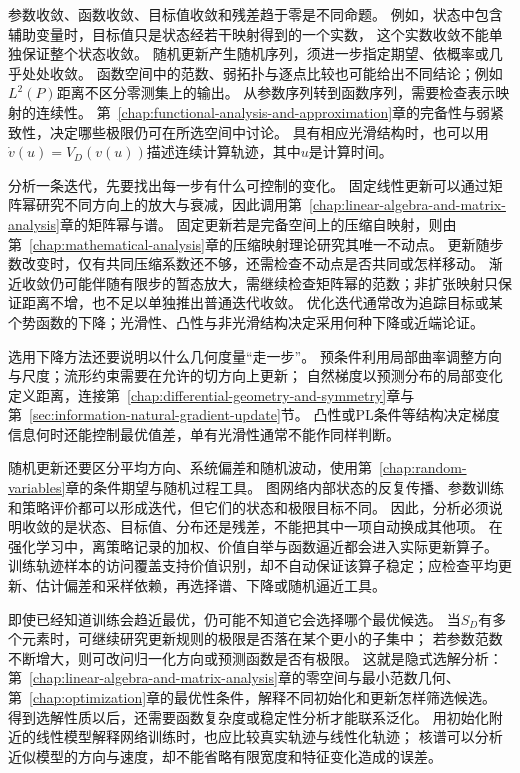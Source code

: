 参数收敛、函数收敛、目标值收敛和残差趋于零是不同命题。
例如，状态中包含辅助变量时，目标值只是状态经若干映射得到的一个实数，
这个实数收敛不能单独保证整个状态收敛。
随机更新产生随机序列，须进一步指定期望、依概率或几乎处处收敛。
函数空间中的范数、弱拓扑与逐点比较也可能给出不同结论；例如$L^2(P)$距离不区分零测集上的输出。
从参数序列转到函数序列，需要检查表示映射的连续性。
第~\ref{chap:functional-analysis-and-approximation}章的完备性与弱紧致性，决定哪些极限仍可在所选空间中讨论。
具有相应光滑结构时，也可以用$\dot v(u)=V_D(v(u))$描述连续计算轨迹，其中$u$是计算时间。

分析一条迭代，先要找出每一步有什么可控制的变化。
固定线性更新可以通过矩阵幂研究不同方向上的放大与衰减，因此调用第~\ref{chap:linear-algebra-and-matrix-analysis}章的矩阵幂与谱。
固定更新若是完备空间上的压缩自映射，则由第~\ref{chap:mathematical-analysis}章的压缩映射理论研究其唯一不动点。
更新随步数改变时，仅有共同压缩系数还不够，还需检查不动点是否共同或怎样移动。
渐近收敛仍可能伴随有限步的暂态放大，需继续检查矩阵幂的范数；非扩张映射只保证距离不增，也不足以单独推出普通迭代收敛。
优化迭代通常改为追踪目标或某个势函数的下降；光滑性、凸性与非光滑结构决定采用何种下降或近端论证。

选用下降方法还要说明以什么几何度量“走一步”。
预条件利用局部曲率调整方向与尺度；流形约束需要在允许的切方向上更新；
自然梯度以预测分布的局部变化定义距离，连接第~\ref{chap:differential-geometry-and-symmetry}章与第~\ref{sec:information-natural-gradient-update}节。
凸性或PL条件等结构决定梯度信息何时还能控制最优值差，单有光滑性通常不能作同样判断。

随机更新还要区分平均方向、系统偏差和随机波动，使用第~\ref{chap:random-variables}章的条件期望与随机过程工具。
图网络内部状态的反复传播、参数训练和策略评价都可以形成迭代，但它们的状态和极限目标不同。
因此，分析必须说明收敛的是状态、目标值、分布还是残差，不能把其中一项自动换成其他项。
在强化学习中，离策略记录的加权、价值自举与函数逼近都会进入实际更新算子。
训练轨迹样本的访问覆盖支持价值识别，却不自动保证该算子稳定；应检查平均更新、估计偏差和采样依赖，再选择谱、下降或随机逼近工具。

即使已经知道训练会趋近最优，仍可能不知道它会选择哪个最优候选。
当$S_D$有多个元素时，可继续研究更新规则的极限是否落在某个更小的子集中；
若参数范数不断增大，则可改问归一化方向或预测函数是否有极限。
这就是隐式选解分析：第~\ref{chap:linear-algebra-and-matrix-analysis}章的零空间与最小范数几何、
第~\ref{chap:optimization}章的最优性条件，解释不同初始化和更新怎样筛选候选。
得到选解性质以后，还需要函数复杂度或稳定性分析才能联系泛化。
用初始化附近的线性模型解释网络训练时，也应比较真实轨迹与线性化轨迹；
核谱可以分析近似模型的方向与速度，却不能省略有限宽度和特征变化造成的误差。

